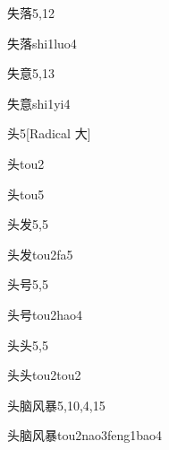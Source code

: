 \begin{entry}{失落}{5,12}
  \begin{phonetics}{失落}{shi1luo4}
  \end{phonetics}
\end{entry}

\begin{entry}{失意}{5,13}
  \begin{phonetics}{失意}{shi1yi4}
  \end{phonetics}
\end{entry}

\begin{entry}{头}{5}[Radical 大]
  \begin{phonetics}{头}{tou2}
  \end{phonetics}
  \begin{phonetics}{头}{tou5}
  \end{phonetics}
\end{entry}

\begin{entry}{头发}{5,5}
  \begin{phonetics}{头发}{tou2fa5}
  \end{phonetics}
\end{entry}

\begin{entry}{头号}{5,5}
  \begin{phonetics}{头号}{tou2hao4}
  \end{phonetics}
\end{entry}

\begin{entry}{头头}{5,5}
  \begin{phonetics}{头头}{tou2tou2}
  \end{phonetics}
\end{entry}

\begin{entry}{头脑风暴}{5,10,4,15}
  \begin{phonetics}{头脑风暴}{tou2nao3feng1bao4}
  \end{phonetics}
\end{entry}

